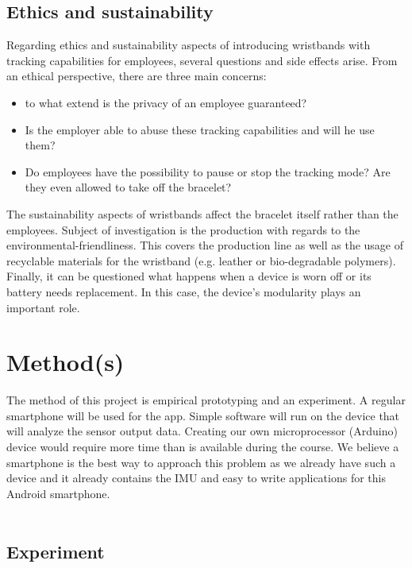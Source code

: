 \documentclass[12pt,twoside, hidelinks]{article}
\begin{document}
\subsection{Ethics and sustainability}
\label{sect:ethics}

Regarding ethics and sustainability aspects of introducing wristbands with tracking capabilities for employees, several questions and side effects arise. From an ethical perspective, there are three main concerns: 
\begin{itemize}
	\item to what extend is the privacy of an employee guaranteed?
	\item Is the employer able to abuse these tracking capabilities and will he use them?
	\item Do employees have the possibility to pause or stop the tracking mode? Are they even allowed to take off the bracelet?
\end{itemize}
The sustainability aspects of wristbands affect the bracelet itself rather than the employees. Subject of investigation is the production with regards to the environmental-friendliness. This covers the production line as well as the usage of recyclable materials for the wristband (e.g. leather or bio-degradable polymers). Finally, it can be questioned what happens when a device is worn off or its battery needs replacement. In this case, the device's modularity plays an important role.

\section{Method(s)}
\label{sec:method}


The method of this project is empirical prototyping and an experiment. A regular smartphone will be used for the app. Simple software will run on the device that will analyze the sensor output data. Creating our own microprocessor (Arduino) device would require more time than is available during the course. We believe a smartphone is the best way to approach this problem as we already have such a device and it already contains the IMU and easy to write applications for this Android smartphone.
\\
\\

\subsection{Experiment}
\label{sect:experiment}
\end{document}
